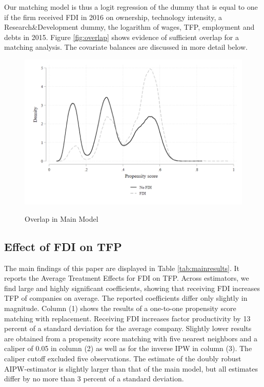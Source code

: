 \documentclass[a4paper,11pt]{scrartcl}
\begin{document}
Our matching model is thus a logit regression of the dummy that is equal to one if the firm received FDI in 2016 on ownership, technology intensity, a Research\&Development dummy, the logarithm of wages, TFP, employment and debts in 2015. Figure \ref{fig:overlap} shows evidence of sufficient overlap for a matching analysis. The covariate balances are discussed in more detail below.

\begin{figure}[h]\centering
	\caption{Overlap in Main Model}
	\includegraphics[width=\textwidth]{graph}
  	\label{fig:graph}
\end{figure} 

\subsection{Effect of FDI on TFP}



The main findings of this paper are displayed in Table \ref{tab:mainresults}. It reports the Average Treatment Effects for FDI on TFP. Across estimators, we find large and highly significant coefficients, showing that receiving FDI increases TFP of companies on average. The reported coefficients differ only slightly in magnitude. 
Column (1) shows the results of a one-to-one propensity score matching with replacement. Receiving FDI  increases factor productivity by 13 percent of a standard deviation for the average company. Slightly lower results are obtained from a propensity score matching with five nearest neighbors and a caliper of 0.05 in column (2) as well as for the inverse IPW in column (3). The caliper cutoff excluded five observations. The estimate of the doubly robust AIPW-estimator is slightly larger than that of the main model, but all estimates differ by no more than 3 percent of a standard deviation.
\end{document}
